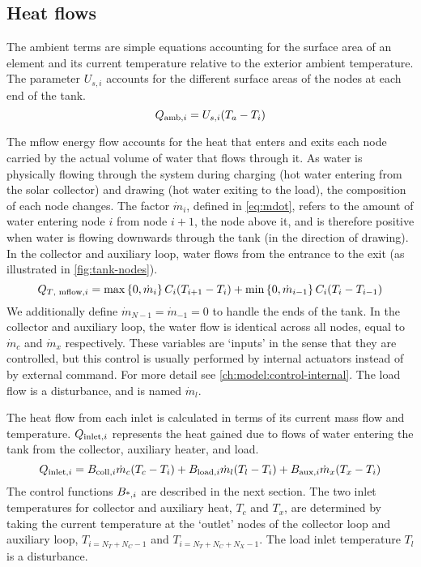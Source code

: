 \subsection{Heat flows}

The ambient terms are simple equations accounting for the surface area of an element and its current temperature relative to the exterior ambient temperature.
The parameter $U_{s, i}$ accounts for the different surface areas of the nodes at each end of the tank.
\begin{equation}
   \label{eq:Q-amb}
   Q_{\text{amb}, i} = U_{s, i} (T_a - T_i)
\end{equation}

The mflow energy flow accounts for the heat that enters and exits each node carried by the actual volume of water that flows through it.
As water is physically flowing through the system during charging (hot water entering from the solar collector) and drawing (hot water exiting to the load), the composition of each node changes.
The factor $\dot{m}_i$, defined in \autoref{eq:mdot}, refers to the amount of water entering node $i$ from node $i+1$, the node above it, and is therefore positive when water is flowing downwards through the tank (in the direction of drawing).
In the collector and auxiliary loop, water flows from the entrance to the exit (as illustrated in \autoref{fig:tank-nodes}).
\begin{equation}
   \label{eq:tank-Q-mflow}
   Q_{\text{$T$, mflow}, i} = \max \left\{ 0, \dot{m}_i \right\}     C_i (T_{i+1} - T_i)
             + \min \left\{ 0, \dot{m}_{i-1} \right\} C_i (T_i - T_{i-1})
\end{equation}
We additionally define $\dot{m}_{N-1} = \dot{m}_{-1} = 0$ to handle the ends of the tank.
In the collector and auxiliary loop, the water flow is identical across all nodes, equal to $\dot{m}_c$ and $\dot{m}_x$ respectively.
These variables are `inputs' in the sense that they are controlled, but this control is usually performed by internal actuators instead of by external command.
For more detail see \autoref{ch:model:control-internal}.
The load flow is a disturbance, and is named $\dot{m}_l$.

The heat flow from each inlet is calculated in terms of its current mass flow and temperature.
$Q_{\text{inlet}, i}$ represents the heat gained due to flows of water entering the tank from the collector, auxiliary heater, and load.
\begin{equation}
   \label{eq:Q-inlet}
   Q_{\text{inlet}, i} = B_{\text{coll}, i} \dot{m}_c (T_c - T_i)
             + B_{\text{load}, i} \dot{m}_l (T_l - T_i)
             + B_{\text{aux}, i} \dot{m}_x (T_x - T_i)
\end{equation}
The control functions $B_{\text{*}, i}$ are described in the next section.
The two inlet temperatures for collector and auxiliary heat, $T_c$ and $T_x$, are determined by taking the current temperature at the `outlet' nodes of the collector loop and auxiliary loop, $T_{i=N_T+N_C-1}$ and $T_{i=N_T+N_C+N_X-1}$.
The load inlet temperature $T_l$ is a disturbance.

